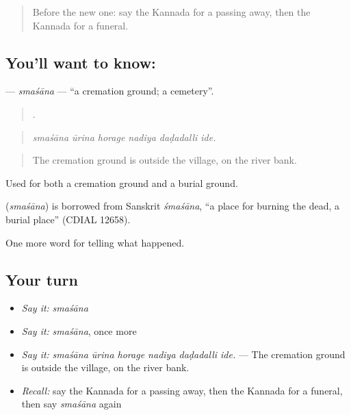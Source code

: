 \label{lesson:KA-C337-smasana}



\begin{quote}
Before the new one: say the Kannada for a passing away, then the Kannada for a funeral.
\end{quote}

\subsection*{You'll want to know: }
\textbf{} — \emph{smaśāna} — \textquotedblleft{}a cremation ground; a cemetery\textquotedblright{}.

\begin{quote}
     .
\end{quote}

\begin{quote}
\emph{smaśāna ūrina horage nadiya daḍadalli ide.}
\end{quote}

\begin{quote}
The cremation ground is outside the village, on the river bank.
\end{quote}

Used for both a cremation ground and a burial ground.

\begin{cousinweb}
\textbf{} (\emph{smaśāna}) is borrowed from Sanskrit \emph{śmaśāna}, \textquotedblleft{}a place for burning the dead, a burial place\textquotedblright{} (CDIAL 12658).
\end{cousinweb}

\begin{grammarlens}[title={What you've built}]
One more word for telling what happened.
\end{grammarlens}

\subsection*{Your turn}
\begin{itemize}
\raggedright
  \item \emph{Say it:} \emph{smaśāna}
  \item \emph{Say it:} \emph{smaśāna}, once more
  \item \emph{Say it:} \emph{smaśāna ūrina horage nadiya daḍadalli ide.} — The cremation ground is outside the village, on the river bank.
  \item \emph{Recall:} say the Kannada for a passing away, then the Kannada for a funeral, then say \emph{smaśāna} again
\end{itemize}

